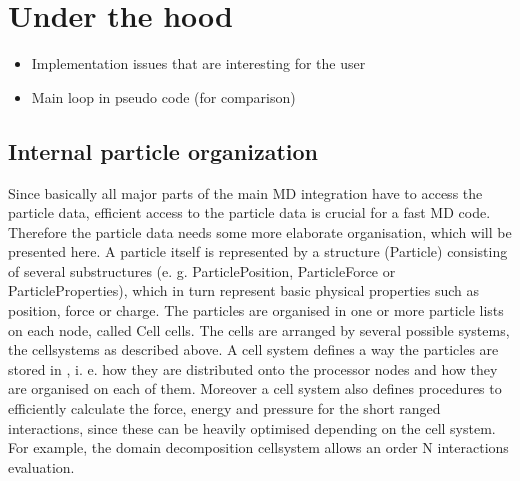 %  
%   
%  
%  
%
\chapter{Under the hood}
\label{chap:underhood}

\begin{itemize}
\item Implementation issues that are interesting for the user
\item Main loop in pseudo code (for comparison)
\end{itemize}

\section{Internal particle organization}
\label{sec:internal-particle-organization}

Since basically all major parts of the main MD integration have to
access the particle data, efficient access to the particle data is
crucial for a fast MD code. Therefore the particle data needs some
more elaborate organisation, which will be presented here. A particle
itself is represented by a structure (Particle) consisting of several
substructures (e. g. ParticlePosition, ParticleForce or
ParticleProperties), which in turn represent basic physical properties
such as position, force or charge. The particles are organised in one
or more particle lists on each node, called Cell cells. The cells are
arranged by several possible systems, the cellsystems as described
above. A cell system defines a way the particles are stored in \es{},
i. e. how they are distributed onto the processor nodes and how they
are organised on each of them. Moreover a cell system also defines
procedures to efficiently calculate the force, energy and pressure for
the short ranged interactions, since these can be heavily optimised
depending on the cell system. For example, the domain decomposition
cellsystem allows an order N interactions evaluation.

